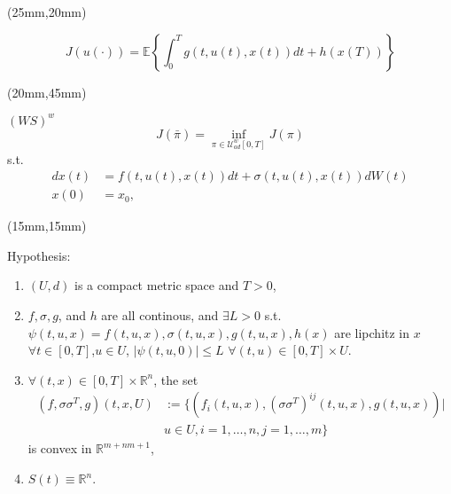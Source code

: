 \begin{frame}
		\begin{textblock*}{80mm}(25mm,20mm)
		\begin{yellowbox}{}
			\begin{equation*}
				J(u(\cdot))= \mathbb{E}\left\{\int_{0}^{T}g(t,u(t),x(t))dt+h(x(T))\right\}
			\end{equation*}
		\end{yellowbox}
	\end{textblock*}
	
	
	\begin{textblock*}{90mm}(20mm,45mm)
		\begin{graybox}{$(WS)^w$}
			\begin{equation*}
				J(\bar{\pi})=\inf_{\pi\in \mathcal{U}^w_{ad}[0,T]} J(\pi)
			\end{equation*}
			s.t.
			\begin{align*}
				dx(t)&=
				f(t,u(t),x(t))dt+\sigma(t,u(t),x(t))dW(t)\\
				x(0)&=
				x_0,
			\end{align*}
		\end{graybox}
	\end{textblock*}
\end{frame}
\begin{frame}[plain]
	\begin{textblock*}{110mm}(15mm,15mm)
		\begin{graybox}{Hypothesis:}
			\begin{enumerate}[(\textbf{{SE}}-1)]
				\item
					$(U,d)$ is a compact metric space and $T>0$,
				\item
					$f,\sigma,g$, and $h$ are all continous, and $\exists L>0$ s.t. $\psi(t,u,x)=f(t,u,x),\sigma(t,u,x),g(t,u,x),h(x)$ are lipchitz in $x$ $\forall t \in [0,T]$,$u\in U$, $|\psi(t,u,0)|\leq L$ $\forall (t,u)\in [0,T]\times U$.
				\item
					$\forall (t,x)\in [0,T]\times \mathbb{R}^n$, the set
					\begin{align*}
						(f,\sigma\sigma^T,g)(t,x,U)&:=\{(f_i(t,u,x),(\sigma\sigma^T)^{ij}(t,u,x),g(t,u,x))|\\
						&u\in U,i=1,\ldots,n,j=1,\ldots,m\}
					\end{align*}
					is convex in $\mathbb{R}^{m+nm+1}$,
				\item 
					$S(t)\equiv\mathbb{R}^n$.
			\end{enumerate}	
		\end{graybox}
	\end{textblock*}
\end{frame}
